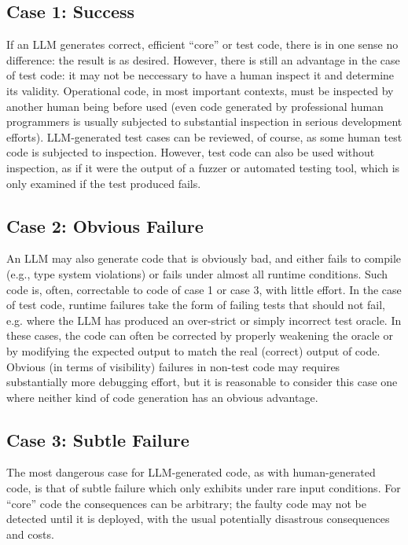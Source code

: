 \documentclass[sigconf,natbib=false]{acmart}
\begin{document}
\subsection{Case 1: Success}

If an LLM generates correct, efficient ``core'' or test code, there is in one sense no
difference: the result is as desired.  However, there is still an
advantage in the case of test code:  it may not be neccessary to have
a human inspect it and determine its validity.  Operational code, in
most important contexts, must be inspected by another human being
before used (even code generated by professional human programmers is
usually subjected to substantial inspection in serious development
efforts).  LLM-generated test cases can be reviewed, of course, as
some human test code is subjected to inspection.  However, test code
can also be used without inspection, as if it were the output of a
fuzzer or automated testing tool, which is only examined if the test
produced fails.

\subsection{Case 2: Obvious Failure}

An LLM may also generate code that is obviously bad, and either fails
to compile (e.g., type system violations) or fails under almost all
runtime conditions.  Such code is, often, correctable to code of case
1 or case 3, with little effort.  In the case of test code, runtime
failures take the form of failing tests that should not fail,
e.g. where the LLM has produced an over-strict or simply incorrect
test oracle.  In these cases, the code can often be corrected by
properly weakening the oracle or by modifying the expected output to
match the real (correct) output of code.  Obvious (in terms of
visibility) failures in non-test code may requires substantially more
debugging effort, but it is reasonable to consider this case one where
neither kind of code generation has an obvious advantage.

\subsection{Case 3: Subtle Failure}

The most dangerous case for LLM-generated code, as with
human-generated code, is that of subtle failure which only exhibits
under rare input conditions.  For ``core'' code the consequences can
be arbitrary; the faulty code may not be detected until it is
deployed, with the usual potentially disastrous consequences and
costs.
\end{document}
